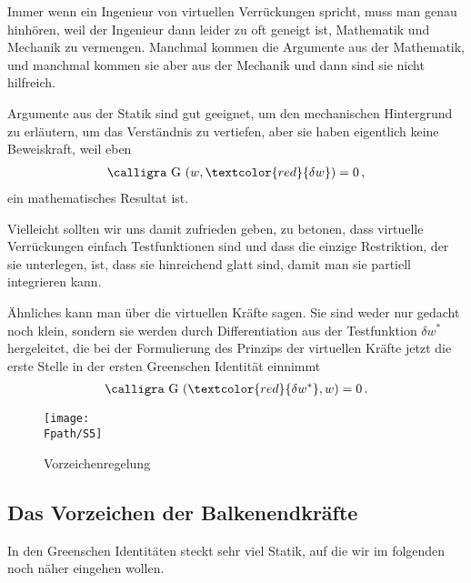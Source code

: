 {Immer wenn ein Ingenieur von virtuellen Verr\"{u}ckungen spricht, muss man genau hinh\"{o}ren, weil der Ingenieur dann leider zu oft geneigt ist, Mathematik und Mechanik zu vermengen. Manchmal kommen die Argumente aus der Mathematik, und manchmal kommen sie aber aus der Mechanik und dann sind sie nicht hilfreich.

Argumente aus der Statik sind gut geeignet, um den mechanischen Hintergrund zu erl\"{a}utern, um das Verst\"{a}ndnis zu vertiefen, aber sie haben eigentlich keine Beweiskraft, weil eben
\begin{align}
\text{\normalfont\calligra G\,\,}(w,\textcolor{red}{\delta w}) = 0\,,
\end{align}
ein mathematisches Resultat ist.

Vielleicht sollten wir uns damit zufrieden geben, zu betonen, dass virtuelle Verr\"{u}ckungen einfach Testfunktionen sind und dass die einzige Restriktion, der sie unterlegen, ist, dass sie hinreichend glatt sind, damit man sie partiell integrieren kann.

\"{A}hnliches kann man \"{u}ber die virtuellen Kr\"{a}fte sagen. Sie sind weder nur gedacht noch klein, sondern sie werden durch Differentiation
aus der Testfunktion $\delta w^* $  hergeleitet, die bei der Formulierung des Prinzips der virtuellen Kr\"{a}fte jetzt die erste Stelle in der ersten Greenschen Identit\"{a}t einnimmt
\begin{align}
\text{\normalfont\calligra G\,\,}(\textcolor{red}{\delta w^*},w) = 0\,.
\end{align}

\begin{figure}[tbp]
\centering
\if {} \sidecaption \fi
\texttt{[image: \\Fpath/S5]}
\caption{Vorzeichenregelung} \label{S5}
%
\end{figure}%

{\textcolor{blau2}{\section{Das Vorzeichen der Balkenendkr\"{a}fte}}}
In den Greenschen Identit\"{a}ten steckt sehr viel Statik, auf die wir im folgenden noch n\"{a}her eingehen wollen.

}
